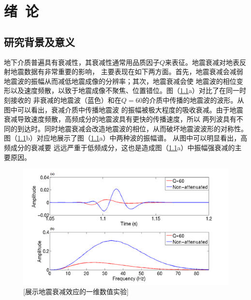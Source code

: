 


\newcommand{\citeA}[2]{\citeauthor{#1}\cite{#1}}

\chapter{绪~论}

\section{研究背景及意义}
地下介质普遍具有衰减性，其衰减性通常用品质因子$Q$来表征。地震衰减对地表反射地震数据有非常重要的影响，
主要表现在如下两方面。首先，地震衰减会减弱地震波的振幅从而减低地震成像的分辨率；其次，地震衰减会使
地震波的相位变形以及速度频散，以致于地震成像不聚焦、位置错位。图（\ref{fig:spectral}a）对比了在同一时刻接收的
非衰减的地震波（蓝色）和在$Q=60$的介质中传播的地震波的波形。从图中可以看出，衰减介质中传播地震波
的振幅被极大程度的吸收衰减。由于地震衰减导致速度频散，高频成分的地震波具有更快的传播速度，所以
两列波具有不同的到达时。同时地震衰减会改造地震波的相位，从而破坏地震波波形的对称性。
图（\ref{fig:spectral}b）对应地展示了图（\ref{fig:spectral}a）中两种波的振幅谱。
从图中可以明显看出，高频成分的衰减要
远远严重于低频成分，这也是造成图（\ref{fig:spectral}a）中振幅强衰减的主要原因。

\begin{figure}[!htbp]
        \centering
        \includegraphics[width=1.0\linewidth]{figure/record_spectral}
        [展示地震衰减效应的一维数值实验]
        \label{fig:spectral}
\end{figure}

